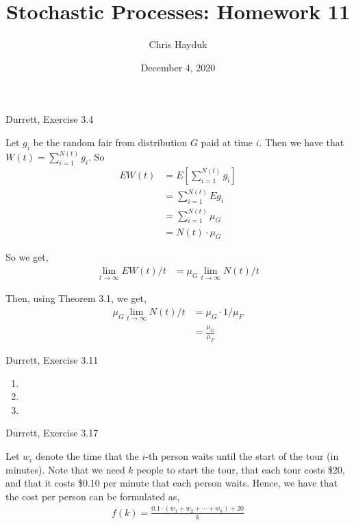 \documentclass[12pt]{article}
\newenvironment{problem}[2][Problem]{\begin{trivlist}
\item[\hskip \labelsep {\bfseries #1}\hskip \labelsep {\bfseries #2.}]}{\end{trivlist}}
\begin{document}
\title{Stochastic Processes: Homework 11}

\author{Chris Hayduk}
\date{December 4, 2020}

\maketitle

\begin{problem}{1}
Durrett, Exercise 3.4
\end{problem}

Let $g_i$ be the random fair from distribution $G$ paid at time $i$. Then we have that $W(t) = \sum_{i = 1}^{N(t)} g_i$. So
\begin{align*}
E W(t) &= E\left[\sum_{i = 1}^{N(t)} g_i\right]\\
&= \sum_{i = 1}^{N(t)} E g_i\\
&= \sum_{i = 1}^{N(t)} \mu_G\\
&= N(t) \cdot \mu_G
\end{align*}

So we get,
\begin{align*}
\lim_{t \to \infty} EW(t)/t &= \mu_G \lim_{t \to \infty} N(t)/t
\end{align*}

Then, using Theorem 3.1, we get,
\begin{align*}
\mu_G \lim_{t \to \infty} N(t)/t &= \mu_G \cdot 1/\mu_F\\
&= \frac{\mu_G}{\mu_F}
\end{align*}

\begin{problem}{2}
Durrett, Exercise 3.11
\end{problem}

\begin{enumerate}[label=\alph*)]

\item

\item

\item

\end{enumerate}

\begin{problem}{3}
Durrett, Exercise 3.17
\end{problem}

Let $w_i$ denote the time that the $i$-th person waits until the start of the tour (in minutes). Note that we need $k$ people to start the tour, that each tour costs \$20, and that it costs \$0.10 per minute that each person waits. Hence, we have that the cost per person can be formulated as,
\begin{align*}
f(k) = \frac{0.1 \cdot (w_1 + w_2 + \cdots + w_k) + 20}{k}
\end{align*}
\end{document}
